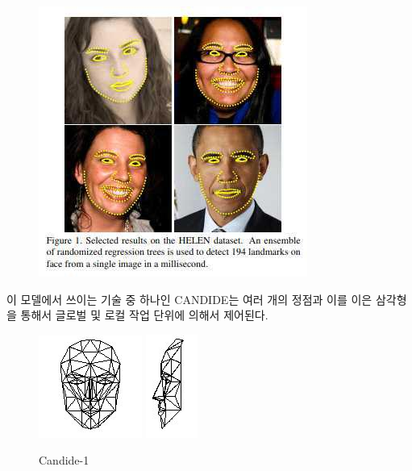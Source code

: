 \documentclass[chapter,oneside]{oblivoir}
\begin{document}
\begin{figure}[h!]
  \centering
    \includegraphics{pic/chp2/img684}
  \caption{\cite{reference7}}
\end{figure}



이 모델에서 쓰이는 기술 중 하나인 CANDIDE는 여러 개의 정점과 이를 이은 삼각형을 통해서 글로벌 및 로컬 작업 단위에 의해서 제어된다.


\begin{figure}[h!]
\centering
\includegraphics{pic/chp2/img690}
\includegraphics{pic/chp2/img693}
\caption{Candide-1}
\end{figure}
\end{document}
